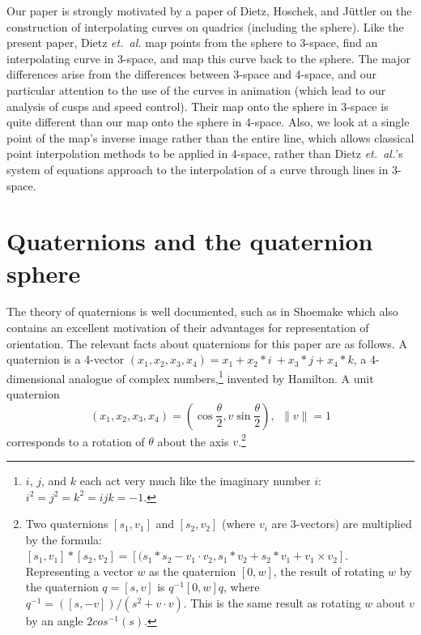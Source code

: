 
Our paper is strongly motivated by %
a paper of Dietz, Hoschek, and J\"{u}ttler
\cite{dietz93} on the construction of interpolating curves on quadrics 
(including the sphere).
Like the present paper, Dietz {\em et.\ al.} map points from the sphere to
3-space, find an interpolating curve in 3-space, and map this curve back
to the sphere.
The major differences arise from the differences between 3-space and
4-space, and our particular attention to the use of the curves in
animation (which lead to our analysis of cusps and speed control).
Their map onto the sphere in 3-space is quite different than our map onto the
sphere in 4-space.
Also, we look at a single point of the map's inverse image rather than the
entire line,
which allows classical point interpolation methods to be applied in 4-space,
rather than Dietz {\em et.\ al.}'s system of equations approach to the interpolation 
of a curve through lines in 3-space.

\section{Quaternions and the quaternion sphere}
\label{sec:quaternion}

The theory of quaternions is well documented, such as in Shoemake
\cite{shoemake85} which also contains an excellent motivation of their
advantages for representation of orientation.
The relevant facts about quaternions for this paper are as follows.
%
A quaternion is a 4-vector $(x_1,x_2,x_3,x_4) = x_1 + \mbox{$x_2*i$}~
+ x_3*j +
x_4*k$, a 4-dimensional analogue of complex numbers,\footnote{$i$, $j$,
	and $k$ each act very much like the imaginary number $i$:
	$i^2 = j^2 = k^2 = ijk = -1$.}
invented by Hamilton.
A unit quaternion 
\[ (x_1,x_2,x_3,x_4) 
= (\cos \frac{\theta}{2}, v \sin \frac{\theta}{2}), \ \ \|v\| = 1
\]
corresponds to a rotation of $\theta$ about the axis $v$.\footnote{Two
	quaternions $[s_1,v_1]$ and $[s_2,v_2]$ (where $v_i$ are 3-vectors)
	are multiplied by the formula: 
	$[s_1,v_1] * [s_2,v_2] = [(s_1*s_2 - v_1 \cdot v_2,
		s_1*v_2 + s_2*v_1 + v_1 \times v_2]$.
	Representing a vector $w$ as the quaternion $[0,w]$,
	the result of rotating $w$ by the quaternion $q = [s,v]$ is
	$q^{-1} [0,w] q$, where $q^{-1} = ([s,-v])/(s^2 + v \cdot v)$.
	This is the same result as rotating $w$ about $v$ by an angle 
	$2 cos^{-1}(s)$.}

